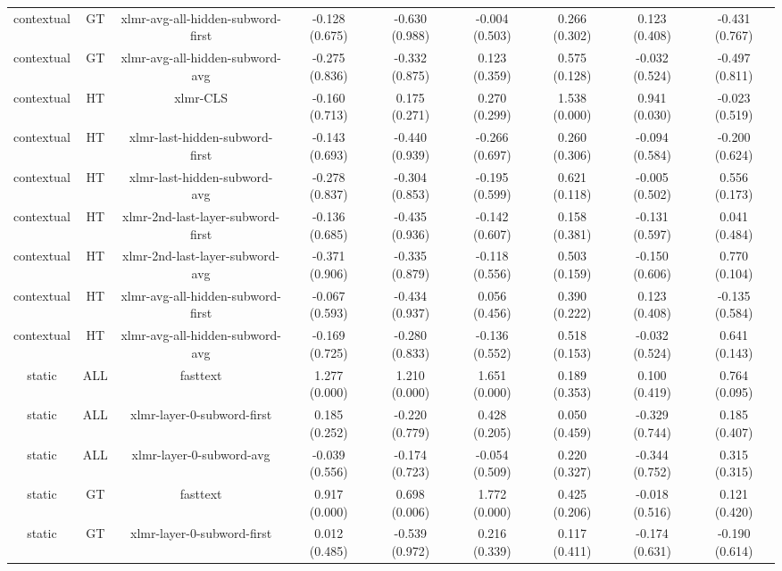 \begin{sidewaystable}[htb]
\begin{tabular}{@{}ccccccccc@{}}
        contextual & GT & xlmr-avg-all-hidden-subword-first & -0.128 (0.675) & -0.630 (0.988) & -0.004 (0.503) & 0.266 (0.302) & 0.123 (0.408) & -0.431 (0.767) \\
        contextual & GT & xlmr-avg-all-hidden-subword-avg & -0.275 (0.836) & -0.332 (0.875) & 0.123 (0.359) & 0.575 (0.128) & -0.032 (0.524) & -0.497 (0.811) \\
        contextual & HT & xlmr-CLS & -0.160 (0.713) & 0.175 (0.271) & 0.270 (0.299) & 1.538 (0.000) & 0.941 (0.030) & -0.023 (0.519) \\
        contextual & HT & xlmr-last-hidden-subword-first & -0.143 (0.693) & -0.440 (0.939) & -0.266 (0.697) & 0.260 (0.306) & -0.094 (0.584) & -0.200 (0.624) \\
        contextual & HT & xlmr-last-hidden-subword-avg & -0.278 (0.837) & -0.304 (0.853) & -0.195 (0.599) & 0.621 (0.118) & -0.005 (0.502) & 0.556 (0.173) \\
        contextual & HT & xlmr-2nd-last-layer-subword-first & -0.136 (0.685) & -0.435 (0.936) & -0.142 (0.607) & 0.158 (0.381) & -0.131 (0.597) & 0.041 (0.484) \\
        contextual & HT & xlmr-2nd-last-layer-subword-avg & -0.371 (0.906) & -0.335 (0.879) & -0.118 (0.556) & 0.503 (0.159) & -0.150 (0.606) & 0.770 (0.104) \\
        contextual & HT & xlmr-avg-all-hidden-subword-first & -0.067 (0.593) & -0.434 (0.937) & 0.056 (0.456) & 0.390 (0.222) & 0.123 (0.408) & -0.135 (0.584) \\
        contextual & HT & xlmr-avg-all-hidden-subword-avg & -0.169 (0.725) & -0.280 (0.833) & -0.136 (0.552) & 0.518 (0.153) & -0.032 (0.524) & 0.641 (0.143) \\
        static & ALL & fasttext & 1.277 (0.000) & 1.210 (0.000) & 1.651 (0.000) & 0.189 (0.353) & 0.100 (0.419) & 0.764 (0.095) \\
        static & ALL & xlmr-layer-0-subword-first & 0.185 (0.252) & -0.220 (0.779) & 0.428 (0.205) & 0.050 (0.459) & -0.329 (0.744) & 0.185 (0.407) \\
        static & ALL & xlmr-layer-0-subword-avg & -0.039 (0.556) & -0.174 (0.723) & -0.054 (0.509) & 0.220 (0.327) & -0.344 (0.752) & 0.315 (0.315) \\
        static & GT & fasttext & 0.917 (0.000) & 0.698 (0.006) & 1.772 (0.000) & 0.425 (0.206) & -0.018 (0.516) & 0.121 (0.420) \\
        static & GT & xlmr-layer-0-subword-first & 0.012 (0.485) & -0.539 (0.972) & 0.216 (0.339) & 0.117 (0.411) & -0.174 (0.631) & -0.190 (0.614) \\

\end{tabular}
\end{sidewaystable}
